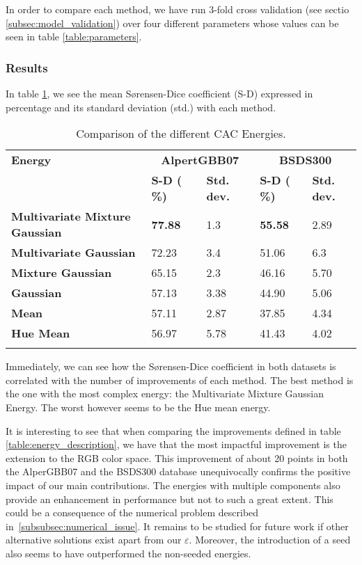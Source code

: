 In order to compare each method, we have run 3-fold cross validation (see sectio~ \ref{subsec:model_validation}) over four different parameters whose values can be seen in table \ref{table:parameters}. 

\subsubsection{Results}

In table \ref{table:cac_results}, we see the mean S\o rensen-Dice coefficient (S-D) expressed in percentage and its standard deviation (std.) with each method.
\begin{table}[h!]
	\centering
	\begin{tabular}{lllll}
		\toprule
		\textbf{Energy}& \multicolumn{2}{c}{\textbf{AlpertGBB07}} & \multicolumn{2}{c}{\textbf{BSDS300}} \\
		& \textbf{S-D ( \%)} & \textbf{Std. dev.}  & \textbf{S-D ( \%)} & \textbf{Std. dev.}  \\ \midrule
		\textbf{Multivariate Mixture Gaussian} & \textbf{77.88} & 1.3    &     \textbf{55.58}  &  2.89     \\
		\textbf{Multivariate Gaussian} & 72.23 & 3.4 & 51.06 & 6.3 \\
		\textbf{Mixture Gaussian} &  65.15 &   2.3    &     46.16 &  5.70 \\
		\textbf{Gaussian} &  57.13 &   3.38    &    44.90  &  5.06     \\
		\textbf{Mean} & 57.11 & 2.87 & 37.85  & 4.34 \\
		\textbf{Hue Mean} & 56.97 & 5.78 & 41.43  & 4.02 \\
		\vspace{0.5em}
	\end{tabular}
	\vspace{-0.4cm}
	\caption{Comparison of the different CAC Energies.}
	\label{table:cac_results}
\end{table}


Immediately, we can see how the S\o rensen-Dice coefficient in both datasets is correlated with the number of improvements of each method. The best method is the one with the most complex energy: the Multivariate Mixture Gaussian Energy. The worst however seems to be the Hue mean energy.

It is interesting to see that when comparing the improvements defined in table \ref{table:energy_description}, we have that the most impactful improvement is the extension to the RGB color space. This improvement of about 20 points in both the AlperGBB07 and the BSDS300 database unequivocally confirms the positive impact of our main contributions. The energies with multiple components also provide an enhancement in performance but not to such a great extent. This could be a consequence of the numerical problem described in~\ref{subsubsec:numerical_issue}. It remains to be studied for future work if other alternative solutions exist apart from our $\varepsilon$. Moreover, the introduction of a seed also seems to have outperformed the non-seeded energies.


